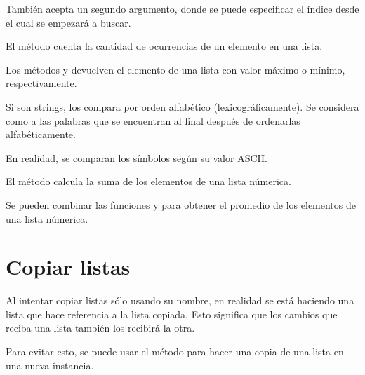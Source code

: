 
También acepta un segundo argumento, donde se puede especificar el índice desde el cual se empezará a buscar.


El método  cuenta la cantidad de ocurrencias de un elemento en una lista.
  

Los métodos  y  devuelven el elemento de una lista con valor máximo o mínimo, respectivamente.


Si son strings, los compara por orden alfabético (lexicográficamente). Se considera como  a las palabras que se encuentran al final después de ordenarlas alfabéticamente.


En realidad, se comparan los símbolos según su valor ASCII.

El método  calcula la suma de los elementos de una lista númerica.
  

Se pueden combinar las funciones  y  para obtener el promedio de los elementos de una lista númerica.


\section{Copiar listas}

Al intentar copiar listas sólo usando su nombre, en realidad se está haciendo una lista que hace referencia a la lista copiada. Esto significa que los cambios que reciba una lista también los recibirá la otra.


Para evitar esto, se puede usar el método  para hacer una copia de una lista en una nueva instancia.

